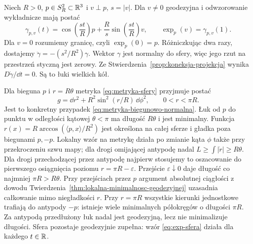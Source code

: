 \begin{przyklad}
\label{prz:geodezyjne-sfera}
Niech $R>0$, $p\in S_R^2\subset\mathbb{R}^3$ i $v\perp p$,
$s=|v|$. Dla $v\ne0$ geodezyjna i odwzorowanie
wykładnicze mają postać
\begin{equation}\label{eq:exp-sfera}
 \gamma_{p,v}(t)
 =\cos\!\left(\frac{st}{R}\right)p
  +\frac{R}{s}\sin\!\left(\frac{st}{R}\right)v,
 \qquad \exp_p(v)=\gamma_{p,v}(1).
\end{equation}
Dla $v=0$ rozumiemy granicę, czyli $\exp_p(0)=p$.
Różniczkując dwa razy, dostajemy
$\ddot\gamma=-(s^2/R^2)\gamma$.
Wektor $\gamma$ jest normalny do sfery,
więc jego rzut na przestrzeń styczną jest zerowy.
Ze Stwierdzenia~\ref{prop:koneksja-projekcja} wynika
$D\dot\gamma/\dd t=0$. Są to łuki wielkich kół.

Dla bieguna $p$ i $r=R\theta$ metryka
\eqref{eq:metryka-sfery} przyjmuje postać
\[
 g=\dd r^2+R^2\sin^2(r/R)\,\dd\phi^2,
 \qquad 0<r<\pi R.
\]
Jest to konkretny przypadek
\eqref{eq:metryka-biegunowo-normalna}.
Łuk od $p$ do punktu w odległości kątowej
$\theta<\pi$ ma długość $R\theta$ i jest
minimalny. Funkcja
$r(x)=R\arccos(\langle p,x\rangle/R^2)$
jest określona na całej sferze i gładka
poza biegunami $p,-p$. Lokalny wzór na metrykę
działa po zmianie kąta $\phi$ także przy
przekroczeniu szwu mapy; dla drogi omijającej
antypodę nadal $L\geq\int|\dot r|\geq R\theta$.
Dla drogi przechodzącej przez antypodę najpierw stosujemy
to oszacowanie do pierwszego osiągnięcia poziomu
$r=\pi R-\varepsilon$. Przejście $\varepsilon\downarrow0$
daje długość co najmniej $\pi R>R\theta$.
Przy przejściach przez $p$ argument absolutnej ciągłości
z dowodu Twierdzenia~\ref{thm:lokalna-minimalnosc-geodezyjnej}
uzasadnia całkowanie mimo niegładkości $r$.
Przy $r=\pi R$ wszystkie kierunki jednostkowe
trafiają do antypody $-p$: istnieje wiele
minimalnych półokręgów o długości $\pi R$.
Za antypodą przedłużony łuk nadal jest
geodezyjną, lecz nie minimalizuje długości.
Sfera pozostaje geodezyjnie zupełna: wzór
\eqref{eq:exp-sfera} działa dla każdego $t\in\mathbb{R}$.
\end{przyklad}

